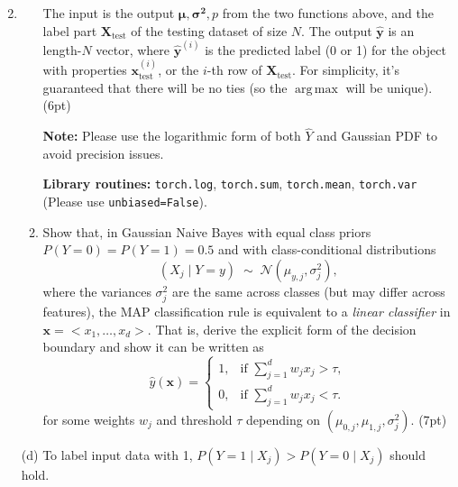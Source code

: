 \documentclass{article}
\newcommand{\bx}{{\boldsymbol x}}
\DeclareMathOperator*{\argmax}{arg\,max}
\theoremstyle{definition}
\theoremstyle{remark}
\newenvironment{Q}
        {%
          \clearpage
          \item
        }
        {%
          \phantom{s} %
          \bigskip
        }
\begin{document}
\begin{enumerate}[font={\Large\bfseries},left=0pt]
\begin{Q}
\begin{enumerate}
			      The input is the output $\bm{\mu},\bm{\sigma^2},p$ from the two functions above, and the label part $\bm{X}_\mathrm{test}$ of the testing dataset of size $N$. The output $\bm{\widehat{y}}$ is an length-$N$ vector, where $\bm{\widehat{y}}^{(i)}$ is the predicted label (0 or 1) for the object with properties $\bm{x}^{(i)}_\mathrm{test}$, or the $i$-th row of $\bm{X}_\mathrm{test}$. For simplicity, it's guaranteed that there will be no ties (so the $\argmax$ will be unique). (6pt)

			      \textbf{Note:} Please use the logarithmic form of both $\widehat{Y}$ and Gaussian  PDF  to avoid precision issues.

			      \textbf{Library routines:} \texttt{torch.log}, \texttt{torch.sum}, \texttt{torch.mean}, \texttt{torch.var} (Please use \texttt{unbiased=False}).
			\item
			      Show that, in Gaussian Naive Bayes with equal class priors $P(Y=0)=P(Y=1)=0.5$ and
			      with class-conditional distributions
			      \[
				      (X_j \mid Y=y) \;\sim\; \mathcal N(\mu_{y,j}, \sigma_j^2),
			      \]
			      where the variances $\sigma_j^2$ are the same across classes (but may differ across features),
			      the MAP classification rule is equivalent to a \emph{linear classifier} in $\bx=< x_1,\dots,x_d >$.
			      That is, derive the explicit form of the decision boundary and show it can be written as
			      \[
				      \widehat{ y}(\bx) =
				      \begin{cases}
					      1, & \text{if } \sum_{j=1}^d w_j x_j > \tau, \\
					      0, & \text{if } \sum_{j=1}^d w_j x_j < \tau.
				      \end{cases}
			      \]
			      for some weights $w_j$ and threshold $\tau$ depending on $(\mu_{0,j},\mu_{1,j},\sigma_j^2)$. (7pt)

		\end{enumerate}



	\end{Q}
	\begin{tcolorbox}
		(d) To label input data with 1, $P(Y = 1 \mid X_j) > P(Y = 0 \mid X_j)$ should hold.


\end{tcolorbox}
\end{enumerate}
\end{document}
